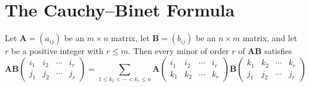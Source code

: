 \documentclass[12pt, a4paper, oneside]{book}
\begin{document}
\section{The Cauchy--Binet Formula}
\begin{theorem}
    Let $\mathbf{A}=\left(a_{i j}\right)$ be an $m \times n$ matrix, let $\mathbf{B}=\left(b_{i j}\right)$ be an $n \times m$ matrix, and let $r$ be a positive integer with $r \leq m$. Then every minor of order $r$ of ${\mathbf{A} \mathbf{B}}$ satisfies
    \[
        \mathbf{A} \mathbf{B}
        \left(
        \begin{matrix}
                i_1 & i_2 & \cdots & i_r \\
                j_1 & j_2 & \cdots & j_r
            \end{matrix}
        \right)
        =
        \sum_{1 \leq k_1<\cdots<k_r \leq n} \mathbf{A}
        \left(
        \begin{matrix}
                i_1 & i_2 & \cdots & i_r \\
                k_1 & k_2 & \cdots & k_r
            \end{matrix}
        \right)
        \mathbf{B}
        \left(
        \begin{matrix}
                k_1 & k_2 & \cdots & k_r \\
                j_1 & j_2 & \cdots & j_r
            \end{matrix}
        \right)
    \]
\end{theorem}
\end{document}
